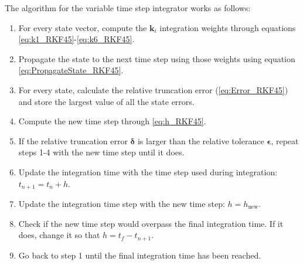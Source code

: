 The algorithm for the variable time step integrator works as follows:
\begin{enumerate}
	\item For every state vector, compute the $\bm k_i$ integration weights through equations \ref{eq:k1_RKF45}-\ref{eq:k6_RKF45}.
	\item Propagate the state to the next time step using those weights using equation \ref{eq:PropagateState_RKF45}.
	\item For every state, calculate the relative truncation error (\ref{eq:Error_RKF45}) and store the largest value of all the state errors.
	\item Compute the new time step through \ref{eq:h_RKF45}.
	\item If the relative truncation error $\bm \delta$ is larger than the relative tolerance $\bm \epsilon$, repeat steps 1-4 with the new time step until it does.
	\item Update the integration time with the time step used during integration: $t_{n+1} = t_n + h$.
	\item Update the integration time step with the new time step: $h = h_{\text{new}}$.
	\item Check if the new time step would overpass the final integration time. If it does, change it so that $h = t_f - t_{n+1}$.
	\item Go back to step 1 until the final integration time has been reached.
\end{enumerate}


